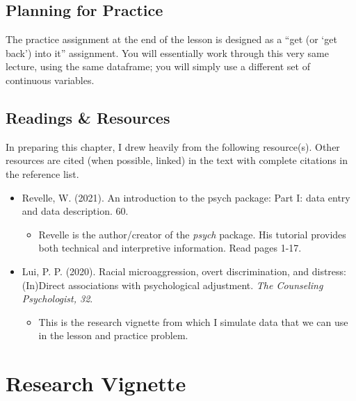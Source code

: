 \documentclass[
  11pt,
]{book}
\providecommand{\tightlist}{%
  \setlength{\itemsep}{0pt}\setlength{\parskip}{0pt}}
\begin{document}
\hypertarget{planning-for-practice}{%
\subsection{Planning for Practice}\label{planning-for-practice}}

The practice assignment at the end of the lesson is designed as a ``get (or `get back') into it'' assignment. You will essentially work through this very same lecture, using the same dataframe; you will simply use a different set of continuous variables.

\hypertarget{readings-resources}{%
\subsection{Readings \& Resources}\label{readings-resources}}

In preparing this chapter, I drew heavily from the following resource(s). Other resources are cited (when possible, linked) in the text with complete citations in the reference list.

\begin{itemize}
\tightlist
\item
  Revelle, W. (2021). An introduction to the psych package: Part I: data entry and data description. 60.

  \begin{itemize}
  \tightlist
  \item
    Revelle is the author/creator of the \emph{psych} package. His tutorial provides both technical and interpretive information. Read pages 1-17.
  \end{itemize}
\item
  Lui, P. P. (2020). Racial microaggression, overt discrimination, and distress: (In)Direct associations with psychological adjustment. \emph{The Counseling Psychologist, 32}.

  \begin{itemize}
  \tightlist
  \item
    This is the research vignette from which I simulate data that we can use in the lesson and practice problem.
  \end{itemize}
\end{itemize}

\hypertarget{research-vignette}{%
\section{Research Vignette}\label{research-vignette}}
\end{document}

